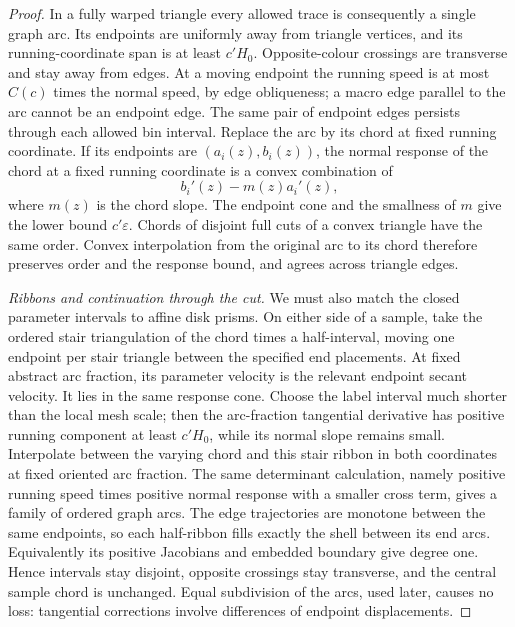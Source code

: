 \begin{proof}
In a fully warped triangle every allowed trace is consequently a
single graph arc.  Its endpoints are uniformly away from triangle
vertices, and its running-coordinate span is at least $c'H_0$.
Opposite-colour crossings are transverse and stay away from edges.
At a moving endpoint the running speed is at most $C(c)$ times the
normal speed, by edge obliqueness; a macro edge parallel to the arc
cannot be an endpoint edge.  The same pair of endpoint edges persists
through each allowed bin interval.  Replace the arc by its chord at
fixed running coordinate.  If its endpoints are $(a_i(z),b_i(z))$,
the normal response of the chord at a fixed running coordinate is a
convex combination of
\[
 b_i'(z)-m(z)a_i'(z),
\]
where $m(z)$ is the chord slope.  The endpoint cone and the smallness
of $m$ give the lower bound $c'\varepsilon$.  Chords of disjoint
full cuts of a convex triangle have the same order.  Convex
interpolation from the original arc to its chord therefore preserves
order and the response bound, and agrees across triangle edges.

\emph{Ribbons and continuation through the cut.}
We must also match the closed parameter intervals to affine disk
prisms.  On either side of a sample, take the ordered stair
triangulation of the chord times a half-interval, moving one endpoint
per stair triangle between the specified end placements.  At fixed
abstract arc fraction, its parameter velocity is the relevant
endpoint secant velocity.  It lies in the same response cone.
Choose the label interval much shorter than the local mesh scale;
then the arc-fraction tangential derivative has positive running
component at least $c'H_0$, while its normal slope remains small.
Interpolate between the varying chord and this stair ribbon in both
coordinates at fixed oriented arc fraction.  The same determinant
calculation, namely positive running speed times positive normal
response with a smaller cross term, gives a family of ordered graph
arcs.  The edge trajectories are monotone between the same
endpoints, so each half-ribbon fills exactly the shell between its
end arcs.  Equivalently its positive Jacobians and embedded boundary
give degree one.  Hence intervals stay disjoint, opposite crossings
stay transverse, and the central sample chord is unchanged.  Equal
subdivision of the arcs, used later, causes no loss: tangential
corrections involve differences of endpoint displacements.


\end{proof}
